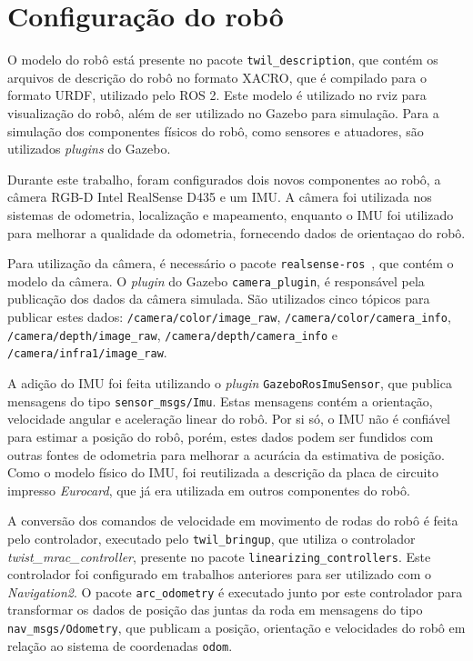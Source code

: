 \documentclass[repeatfields,xlists,xpacks,oneside,yearsonly]{ufrgscca}
\begin{document}
\section{Configuração do robô}



O modelo do robô está presente no pacote \texttt{twil\_description}, que contém
os arquivos de descrição do robô no formato XACRO, que é compilado para o formato
URDF, utilizado pelo ROS 2.
Este modelo é utilizado no rviz para visualização do robô, além de ser utilizado
no Gazebo para simulação.
Para a simulação dos componentes físicos do robô, como sensores e atuadores,
são utilizados \textit{plugins} do Gazebo.

Durante este trabalho, foram configurados dois novos componentes ao robô, a câmera
RGB-D Intel RealSense D435 e um IMU.
A câmera foi utilizada nos sistemas de odometria, localização e mapeamento,
enquanto o IMU foi utilizado para melhorar a qualidade da odometria,
fornecendo dados de orientaçao do robô.

Para utilização da câmera, é necessário o pacote
\texttt{realsense-ros}~\cite{realsense_ros}, que contém o modelo da câmera.
O \textit{plugin} do Gazebo \texttt{camera\_plugin},
é responsável pela publicação dos dados da câmera simulada.
São utilizados cinco tópicos para publicar estes dados:
\texttt{/camera/color/image\_raw}, \texttt{/camera/color/camera\_info},
\texttt{/camera/depth/image\_raw}, \texttt{/camera/depth/camera\_info} e
\texttt{/camera/infra1/image\_raw}.

A adição do IMU foi feita utilizando o \textit{plugin}
\texttt{GazeboRosImuSensor}, que publica mensagens do tipo
\texttt{sensor\_msgs/Imu}.
Estas mensagens contém a orientação, velocidade angular e aceleração linear do robô.
Por si só, o IMU não é confiável para estimar a posição do robô, porém, estes
dados podem ser fundidos com outras fontes de odometria para melhorar a
acurácia da estimativa de posição.
Como o modelo físico do IMU, foi reutilizada
a descrição da placa de circuito impresso \textit{Eurocard},
que já era utilizada em outros componentes do robô.

A conversão dos comandos de velocidade em movimento de rodas do
robô é feita pelo controlador, executado pelo \texttt{twil\_bringup},
que utiliza o controlador \textit{twist\_mrac\_controller},
presente no pacote \texttt{linearizing\_controllers}.
Este controlador foi configurado em trabalhos anteriores para
ser utilizado com o \textit{Navigation2}.
O pacote \texttt{arc\_odometry} é executado junto por este
controlador para transformar os dados de posição das juntas
da roda em mensagens do tipo \texttt{nav\_msgs/Odometry},
que publicam a posição, orientação e velocidades do robô em relação
ao sistema de coordenadas \texttt{odom}.
\end{document}
